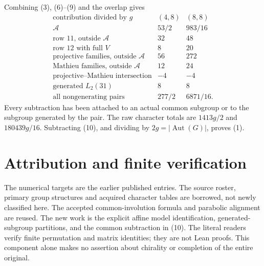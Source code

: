 \documentclass[11pt,a4paper]{article}
\begin{document}
Combining (3), (6)--(9) and the overlap gives
\[
\begin{array}{c|rr}
\text{contribution divided by }g&(4,8)&(8,8)\\\hline
\mathcal A&53/2&983/16\\
\text{row 11, outside }\mathcal A&32&48\\
\text{row 12 with full }V&8&20\\
\text{projective families, outside }\mathcal A&56&272\\
\text{Mathieu families, outside }\mathcal A&12&24\\
\text{projective--Mathieu intersection}&-4&-4\\
\text{generated }L_2(31)&8&8\\\hline
\text{all nongenerating pairs}&277/2&6871/16.
\end{array}                                                \tag{10}
\]
Every subtraction has been attached to an actual common subgroup
or to the subgroup generated by the pair. The raw character totals
are $1413g/2$ and $180439g/16$. Subtracting (10), and dividing by
$2g=|\operatorname{Aut}(G)|$, proves (1).

\section*{Attribution and finite verification}
The numerical targets are the earlier published entries. The source
roster, primary group structures and acquired character tables are
borrowed, not newly classified here. The accepted common-involution
formula and parabolic alignment are reused. The new work is the
explicit affine model identification, generated-subgroup partitions,
and the common subtraction in (10). The literal readers verify
finite permutation and matrix identities; they are not Lean proofs.
This component alone makes no assertion about chirality or completion
of the entire original.
\end{document}
